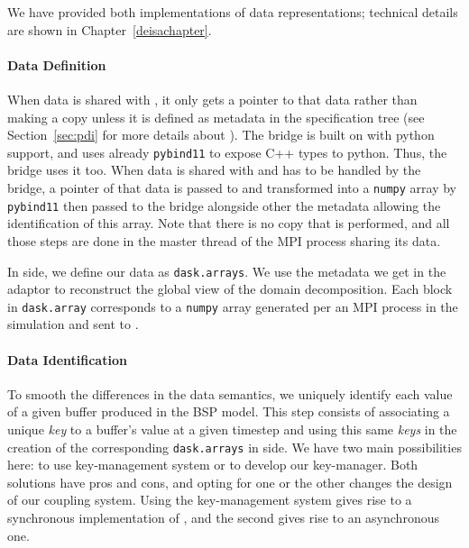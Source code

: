 We have provided both implementations of data representations; technical details are shown in Chapter~\ref{deisachapter}.

\paragraph{Data Definition}\label{sec:datamodel:datadef}

When data is shared with \pdi, it only gets a pointer to that data rather than making a copy unless it is defined as metadata in the specification tree (see Section~\ref{sec:pdi} for more details about \pdi). 
The bridge is built on \pdi with python support, and \pdi uses already \texttt{pybind11} to expose C++ types to python. Thus, the bridge uses it too. 
When data is shared with \pdi and has to be handled by the bridge, a pointer of that data is passed to \pdi and transformed into a \texttt{numpy} array by \texttt{pybind11} then passed to the bridge alongside other the metadata allowing the identification of this array.
Note that there is no copy that is performed, and all those steps are done in the master thread of the MPI process sharing its data. 

In \dask side, we define our data as \texttt{dask.arrays}. We use the metadata we get in the adaptor to reconstruct the global view of the domain decomposition. Each block in \texttt{dask.array} corresponds to a \texttt{numpy} array generated per an MPI process in the simulation and sent to \dask. 

\paragraph{Data Identification}\label{sec:datamodel:dataid}

To smooth the differences in the data semantics, we uniquely identify each value of a given buffer produced in the BSP model. This step consists of associating a unique \textit{key} to a buffer's value at a given timestep and using this same \textit{keys} in the creation of the corresponding \texttt{dask.arrays} in \dask side. We have two main possibilities here: to use \dask key-management system or to develop our key-manager. 
Both solutions have pros and cons, and opting for one or the other changes the design of our coupling system. Using the \dask key-management system gives rise to a synchronous implementation of \deisa, and the second gives rise to an asynchronous one. 

